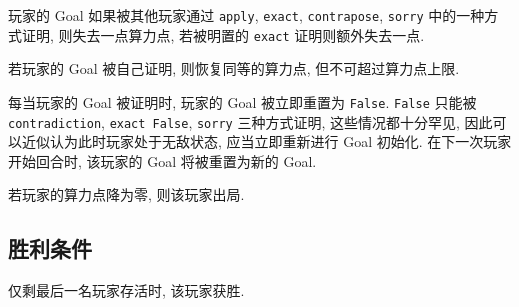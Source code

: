 \documentclass[UTF8]{ctexart}
\DeclareMathOperator{\0}{\mathbf{0}}                    %
\newcommand{\<}{\langle}
\renewcommand{\>}{\rangle}                              %
\theoremstyle{MyStyle} %
\newcommand*{\lean}[1]{\texttt{\color{blue}#1}}
\begin{document}
        玩家的 Goal 如果被其他玩家通过 \lean{apply}, \lean{exact}, \lean{contrapose}, \texttt{\color{red}sorry} 中的一种方式证明, 则失去一点算力点, 若被明置的 \lean{exact} 证明则额外失去一点. 

        若玩家的 Goal 被自己证明, 则恢复同等的算力点, 但不可超过算力点上限. 

        每当玩家的 Goal 被证明时, 玩家的 Goal 被立即重置为 \lean{False}. \lean{False} 只能被 \lean{contradiction}, \lean{exact False}, \texttt{\color{red}sorry} 三种方式证明, 这些情况都十分罕见, 因此可以近似认为此时玩家处于无敌状态, 应当立即重新进行 Goal 初始化. 在下一次玩家开始回合时, 该玩家的 Goal 将被重置为新的 Goal. 

        若玩家的算力点降为零, 则该玩家出局. 

    \subsection{胜利条件}

        仅剩最后一名玩家存活时, 该玩家获胜. 
\end{document}
